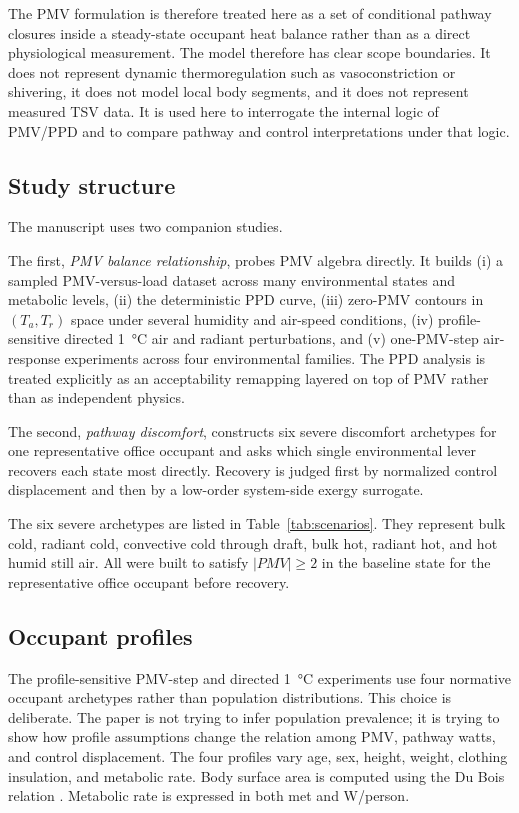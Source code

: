 \documentclass[preprint,authoryear,12pt]{elsarticle}
\begin{document}
The PMV formulation is therefore treated here as a set of conditional pathway closures inside a steady-state occupant heat balance rather than as a direct physiological measurement. The model therefore has clear scope boundaries. It does not represent dynamic thermoregulation such as vasoconstriction or shivering, it does not model local body segments, and it does not represent measured TSV data. It is used here to interrogate the internal logic of PMV/PPD and to compare pathway and control interpretations under that logic.

\subsection{Study structure}

The manuscript uses two companion studies.

The first, \textit{PMV balance relationship}, probes PMV algebra directly. It builds (i) a sampled PMV-versus-load dataset across many environmental states and metabolic levels, (ii) the deterministic PPD curve, (iii) zero-PMV contours in $(T_a, T_r)$ space under several humidity and air-speed conditions, (iv) profile-sensitive directed \SI{1}{\celsius} air and radiant perturbations, and (v) one-PMV-step air-response experiments across four environmental families. The PPD analysis is treated explicitly as an acceptability remapping layered on top of PMV rather than as independent physics.

The second, \textit{pathway discomfort}, constructs six severe discomfort archetypes for one representative office occupant and asks which single environmental lever recovers each state most directly. Recovery is judged first by normalized control displacement and then by a low-order system-side exergy surrogate.

The six severe archetypes are listed in Table~\ref{tab:scenarios}. They represent bulk cold, radiant cold, convective cold through draft, bulk hot, radiant hot, and hot humid still air. All were built to satisfy $|PMV| \geq 2$ in the baseline state for the representative office occupant before recovery.



\subsection{Occupant profiles}

The profile-sensitive PMV-step and directed \SI{1}{\celsius} experiments use four normative occupant archetypes rather than population distributions. This choice is deliberate. The paper is not trying to infer population prevalence; it is trying to show how profile assumptions change the relation among PMV, pathway watts, and control displacement. The four profiles vary age, sex, height, weight, clothing insulation, and metabolic rate. Body surface area is computed using the Du Bois relation \citep{DuBois1916}. Metabolic rate is expressed in both met and \si{W/person}.
\end{document}
